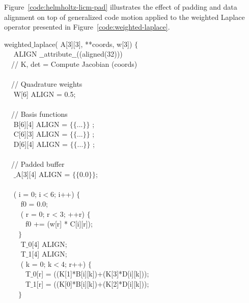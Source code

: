 Figure~\ref{code:helmholtz-licm-pad} illustrates the effect of padding and data alignment on top of generalized code motion applied to the weighted Laplace operator presented in Figure~\ref{code:weighted-laplace}.

\begin{algorithm}
\scriptsize\ttfamily
{}

 weighted$\_$laplace( A[3][3],  **coords,  w[3]) $\lbrace$\\
~~ ALIGN $\_\_$attribute$\_\_$((aligned(32))) \\
~~// K, det = Compute Jacobian (coords) \\
~~\\
~~// Quadrature weights \\
~~ W[6] ALIGN = {0.5}; \\
~~\\
~~// Basis functions \\
~~ B[6][4] ALIGN = $\lbrace\lbrace$...$\rbrace\rbrace$ ;\\
~~ C[6][3] ALIGN = $\lbrace\lbrace$...$\rbrace\rbrace$ ;\\
~~ D[6][4] ALIGN = $\lbrace\lbrace$...$\rbrace\rbrace$ ;\\
~~\\
~~// Padded buffer \\
~~ $\_$A[3][4] ALIGN = $\lbrace\lbrace$0.0$\rbrace\rbrace$;\\
~~\\
~~ ( i = 0; i$<$6; i++) $\lbrace$ \\
~~~~ f0  = 0.0;\\
~~~~ ( r  = 0; r < 3; ++r) $\lbrace$ \\
~~~~~~f0 += (w[r] * C[i][r]);\\
~~~~$\rbrace$ \\
~~~~ T$\_$0[4] ALIGN;\\
~~~~ T$\_$1[4] ALIGN;\\
~~~~ ( k = 0; k$<$4; r++) $\lbrace$ \\
~~~~~~T$\_$0[r] = ((K[1]*B[i][k])+(K[3]*D[i][k]));\\
~~~~~~T$\_$1[r] = ((K[0]*B[i][k])+(K[2]*D[i][k]));\\
~~~~$\rbrace$\\

\end{algorithm}

